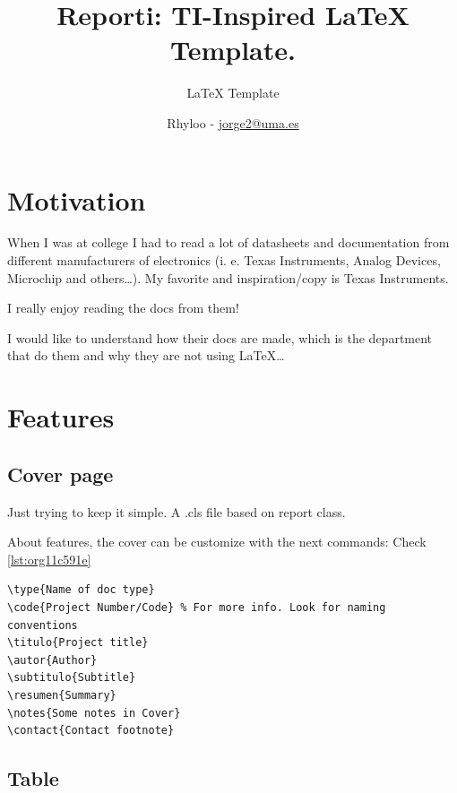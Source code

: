 \documentclass{reporti}
\date{}
\title{Reporti: TI-Inspired \LaTeX{} Template.}
\begin{document}
\subtitle{LaTeX Template}
\author{Rhyloo - \href{mailto:jorge2@uma.es}{jorge2@uma.es}}


\summary{}


\cover[width=1.35\textwidth][continue]


\section{Motivation}
\label{sec:org799a10b}

When I was at college I had to read a lot of datasheets and documentation from different manufacturers of electronics (i. e. Texas Instruments, Analog Devices, Microchip and others\ldots{}). My favorite and inspiration/copy is Texas Instruments.

I really enjoy reading the docs from them!

I would like to understand how their docs are made, which is the department that do them and why they are not using \LaTeX{}\ldots{} 

\section{Features}
\label{sec:orgc1f6da2}

\subsection{Cover page}
\label{sec:orga1c6089}
Just trying to keep it simple. A .cls file based on report class.

About features, the cover can be customize with the next commands: Check \ref{lst:org11c591e}
\begin{listing}[htbp]
\begin{verbatim}
\type{Name of doc type}
\code{Project Number/Code} % For more info. Look for naming conventions
\titulo{Project title} 
\autor{Author}
\subtitulo{Subtitle}
\resumen{Summary}
\notes{Some notes in Cover}
\contact{Contact footnote}
\end{verbatim}
\caption{\label{lst:org11c591e}test\_code}
\end{listing}

\subsection{Table}
\label{sec:orgb8297b7}
\end{document}
